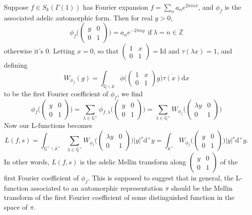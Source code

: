 \documentclass[12pt,a4paper,english]{article}
\theoremstyle{plain}
\theoremstyle{definition}
\begin{document}
Suppose $f\in S_{k}(\Gamma(1))$ has Fourier expansion $f=\sum_{n}a_{n}e^{2\pi i n\pi}$, and $\phi_{f}$ is the associated adelic automorphic form. Then for real $y>0$, 
\begin{equation*}
    \phi_{f}\bigg(\begin{pmatrix}
    y&0\\
    0&1
    \end{pmatrix}\bigg)=a_{n}e^{-2\pi ny}\ \ \text{if}\ \lambda=n\in\mathbb{Z}
\end{equation*}
otherwise it's 0.
Letting $x=0$, so that $\begin{pmatrix}
1&x\\
0&1
\end{pmatrix}=\text{Id}$ and $\tau(\lambda x)=1$, and defining 
\begin{equation*}
    W_{\phi_{f}}(g)=\int_{\mathbb{Q}\backslash\mathbb{A}}\phi\bigg(\begin{pmatrix}
    1&x\\
    0&1
    \end{pmatrix}g\bigg)\overline{\tau(x)}\text{d}x
\end{equation*}
to be the first Fourier coefficient of $\phi_{f}$, we find 
\begin{equation*}
    \phi_{f}\bigg(\begin{pmatrix}
    y&0\\
    0&1
    \end{pmatrix}\bigg)=\sum_{\lambda\in\mathbb{Q}^{\times}}\phi_{f,\lambda}\bigg(\begin{pmatrix}
    y&0\\
    0&1
    \end{pmatrix}\bigg)=\sum_{\lambda\in\mathbb{Q}^{\times}}W_{\phi_{f}}\bigg(\begin{pmatrix}
    \lambda y&0\\
    0&1
    \end{pmatrix}\bigg)
\end{equation*}
Now our L-functions becomes
\begin{equation*}
    L(f,s)=\int_{\mathbb{Q}^{\times}\backslash\mathbb{A}^{\times}}\sum_{\lambda\in\mathbb{Q}^{\times}}W_{\phi_{f}}\bigg(\begin{pmatrix}
    \lambda y&0\\
    0&1
    \end{pmatrix}\bigg)|y|^{s}\text{d}^{\times}y=\int_{\mathbb{A}^{\times}}W_{\phi_{f}}\bigg(\begin{pmatrix}
    y&0\\
    0&1
    \end{pmatrix}\bigg)|y|^{s}\text{d}^{\times}y.
\end{equation*}
In other words, $L(f,s)$ is the adelic Mellin transform along $\begin{pmatrix}
y&0\\
0&1
\end{pmatrix}$ of the first Fourier coefficient of $\phi_{f}$. This is supposed to suggest that in general, the L-function associated to an automorphic representation $\pi$ should be the Mellin transform of the first Fourier coefficient of some distinguished function in the space of $\pi$.
\end{document}
